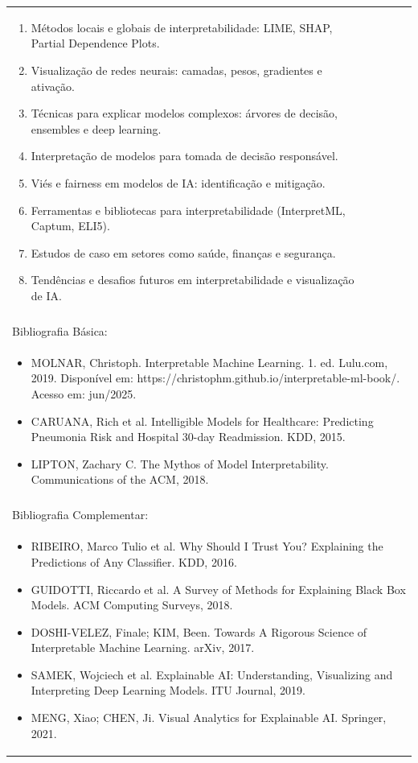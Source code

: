 \documentclass[11pt]{article}
\begin{document}
\begin{center}
\begin{longtable}{|p{4cm}|p{4cm}|p{4cm}|p{4cm}|}
{\begin{enumerate}
\item Métodos locais e globais de interpretabilidade: LIME, SHAP, Partial Dependence Plots.
\item Visualização de redes neurais: camadas, pesos, gradientes e ativação.
\item Técnicas para explicar modelos complexos: árvores de decisão, ensembles e deep learning.
\item Interpretação de modelos para tomada de decisão responsável.
\item Viés e fairness em modelos de IA: identificação e mitigação.
\item Ferramentas e bibliotecas para interpretabilidade (InterpretML, Captum, ELI5).
\item Estudos de caso em setores como saúde, finanças e segurança.
\item Tendências e desafios futuros em interpretabilidade e visualização de IA.\end{enumerate}}\\
\multicolumn{4}{|p{16cm}|}{}\\
\hline
\multicolumn{4}{|p{16cm}|}{Bibliografia Básica:}\\
\multicolumn{4}{|p{\dimexpr 16cm + 6\tabcolsep\relax}|}{%
\begin{itemize}\item MOLNAR, Christoph. Interpretable Machine Learning. 1. ed. Lulu.com, 2019. Disponível em: https://christophm.github.io/interpretable-ml-book/. Acesso em: jun/2025.
\item CARUANA, Rich et al. Intelligible Models for Healthcare: Predicting Pneumonia Risk and Hospital 30-day Readmission. KDD, 2015.
\item LIPTON, Zachary C. The Mythos of Model Interpretability. Communications of the ACM, 2018.\end{itemize}}\\
\multicolumn{4}{|p{16cm}|}{}\\
\hline
\multicolumn{4}{|p{16cm}|}{Bibliografia Complementar:}\\
\multicolumn{4}{|p{\dimexpr 16cm + 6\tabcolsep\relax}|}{%
\begin{itemize}\item RIBEIRO, Marco Tulio et al. Why Should I Trust You? Explaining the Predictions of Any Classifier. KDD, 2016.
\item GUIDOTTI, Riccardo et al. A Survey of Methods for Explaining Black Box Models. ACM Computing Surveys, 2018.
\item DOSHI-VELEZ, Finale; KIM, Been. Towards A Rigorous Science of Interpretable Machine Learning. arXiv, 2017.
\item SAMEK, Wojciech et al. Explainable AI: Understanding, Visualizing and Interpreting Deep Learning Models. ITU Journal, 2019.
\item MENG, Xiao; CHEN, Ji. Visual Analytics for Explainable AI. Springer, 2021.\end{itemize}}\\
\hline
\end{longtable}
\end{center}
\end{document}
